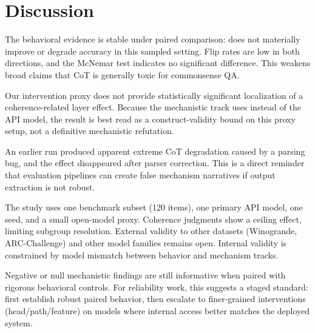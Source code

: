 \section{Discussion}
\label{sec:discussion}

The behavioral evidence is stable under paired comparison: \cotprompt does not materially improve or degrade \csqa accuracy in this sampled setting. Flip rates are low in both directions, and the McNemar test indicates no significant difference. This weakens broad claims that CoT is generally toxic for commonsense QA.

Our intervention proxy does not provide statistically significant localization of a coherence-related layer effect. Because the mechanistic track uses \proxy instead of the API model, the result is best read as a construct-validity bound on this proxy setup, not a definitive mechanistic refutation.

An earlier run produced apparent extreme CoT degradation caused by a parsing bug, and the effect disappeared after parser correction. This is a direct reminder that evaluation pipelines can create false mechanism narratives if output extraction is not robust.

The study uses one benchmark subset (120 \csqa items), one primary API model, one seed, and a small open-model proxy. Coherence judgments show a ceiling effect, limiting subgroup resolution. External validity to other datasets (\eg Winogrande, ARC-Challenge) and other model families remains open. Internal validity is constrained by model mismatch between behavior and mechanism tracks.

Negative or null mechanistic findings are still informative when paired with rigorous behavioral controls. For reliability work, this suggests a staged standard: first establish robust paired behavior, then escalate to finer-grained interventions (head/path/feature) on models where internal access better matches the deployed system.
